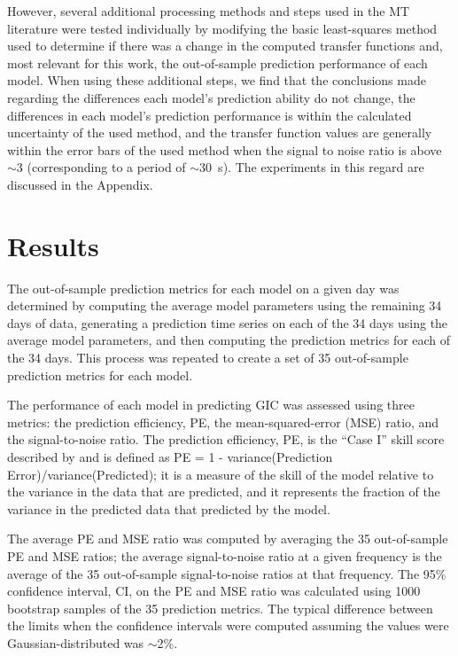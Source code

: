 \documentclass[draft,linenumbers]{agujournal2018}
\begin{document}
However, several additional processing methods and steps used in the MT literature were tested individually by modifying the basic least-squares method used to determine if there was a change in the computed transfer functions and, most relevant for this work, the out-of-sample prediction performance of each model. When using these additional steps, we find that the conclusions made regarding the differences each model's prediction ability do not change, the differences in each model's prediction performance is within the calculated uncertainty of the used method, and the transfer function values are generally within the error bars of the used method when the signal to noise ratio is above $\sim$3 (corresponding to a period of $\sim 30$~s). The experiments in this regard are discussed in the Appendix.

\section{Results}

The out-of-sample prediction metrics for each model on a given day was determined by computing the average model parameters using the remaining 34 days of data, generating a prediction time series on each of the 34 days using the average model parameters, and then computing the prediction metrics for each of the 34 days. This process was repeated to create a set of 35 out-of-sample prediction metrics for each model.

The performance of each model in predicting GIC was assessed using three metrics: the prediction efficiency, PE, the mean-squared-error (MSE) ratio, and the signal-to-noise ratio. 
The prediction efficiency, PE, is the ``Case I'' skill score described by \cite{Murphy1988} and is defined as PE = 1 - variance(Prediction Error)/variance(Predicted); it is a measure of the skill of the model relative to the variance in the data that are predicted, and it represents the fraction of the variance in the predicted data that predicted by the model.

The average PE and MSE ratio was computed by averaging the 35 out-of-sample PE and MSE ratios; the average signal-to-noise ratio at a given frequency is the average of the 35  out-of-sample signal-to-noise ratios at that frequency. The 95\% confidence interval, CI, on the PE and MSE ratio was calculated using 1000 bootstrap samples of the 35 prediction metrics. The typical difference between the limits when the confidence intervals were computed assuming the values were Gaussian-distributed was $\sim$2\%.
\end{document}
